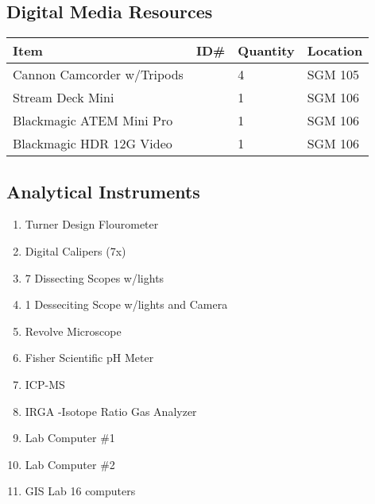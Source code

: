 \documentclass[12pt]{../SOP4_alpha}\usepackage[]{graphicx}\usepackage[]{color}
\begin{document}
\subsection{Digital Media Resources}
\begin{tabular}{|l|l|l|l|}
\hline
Item      & ID\#  & Quantity & Location \\ \hline
Cannon Camcorder w/Tripods   && 4 & SGM 105 \\
Stream Deck Mini && 1 & SGM 106 \\
Blackmagic ATEM Mini Pro && 1 & SGM 106\\
Blackmagic HDR 12G Video && 1 & SGM 106\\
\hline
\end{tabular}

\subsection{Analytical Instruments}
\begin{enumerate}
  \item Turner Design Flourometer
  \item Digital Calipers (7x)
  \item 7 Dissecting Scopes w/lights
  \item 1 Desseciting Scope w/lights and Camera
  \item Revolve Microscope
  \item Fisher Scientific pH Meter
  \item ICP-MS
  \item IRGA  -Isotope Ratio Gas Analyzer
  \item Lab Computer \#1
  \item Lab Computer \#2

\item GIS Lab 16 computers
\end{enumerate}
\end{document}
